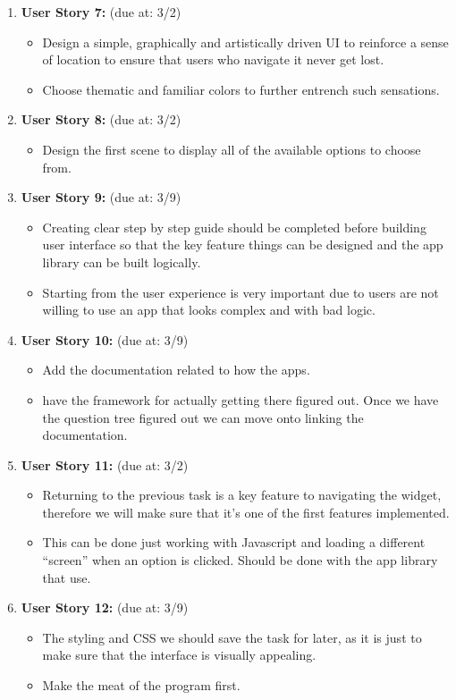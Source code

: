 \documentclass[12pt, letterpaper]{article}
\begin{document}
\begin{enumerate}
\begin{itemize}
	\end{itemize}
	\item \textbf{User Story 7:} (due at: 3/2) 
	\begin{itemize}
		\item Design a simple, graphically and artistically driven UI to reinforce a sense of location to ensure that users who navigate it never get lost. 
		\item Choose thematic and familiar colors to further entrench such sensations. 
	\end{itemize}
	\item \textbf{User Story 8:} (due at: 3/2)
	\begin{itemize}
		\item Design the first scene to display all of the available options to choose from.
	\end{itemize}
	\item \textbf{User Story 9:} (due at: 3/9)
	\begin{itemize}
		\item Creating clear step by step guide should be completed before building user interface so that the key feature things can be designed and the app library can be built logically. 
		\item Starting from the user experience is very important due to users are not willing to use an app that looks complex and with bad logic.
	\end{itemize}
	\item \textbf{User Story 10:} (due at: 3/9)
	\begin{itemize}
		\item Add the documentation related to how the apps.
		\item have the framework for actually getting there figured out. Once we have the question tree figured out we can move onto linking the documentation. 
	\end{itemize}
	\item \textbf{User Story 11:} (due at: 3/2)
	\begin{itemize}
		\item Returning to the previous task is a key feature to navigating the widget, therefore we will make sure that it’s one of the first features implemented.
		\item This can be done just working with Javascript and loading a different “screen” when an option is clicked. Should be done with the app library that use. 
	\end{itemize}
	\item \textbf{User Story 12:} (due at: 3/9)
	\begin{itemize}
		\item The styling and CSS we should save the task for later, as it is just to make sure that the interface is visually appealing. 
		\item Make the meat of the program first.
	\end{itemize}
\end{enumerate}	
\end{document}
